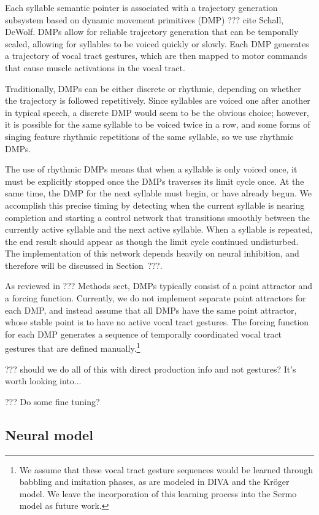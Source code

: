 Each syllable semantic pointer
is associated with a
trajectory generation subsystem
based on dynamic movement primitives (DMP)
??? cite Schall, DeWolf.
DMPs allow for reliable trajectory generation
that can be temporally scaled,
allowing for syllables to be voiced
quickly or slowly.
Each DMP generates a trajectory
of vocal tract gestures,
which are then mapped to
motor commands that cause
muscle activations in the vocal tract.

Traditionally, DMPs can be either discrete or rhythmic,
depending on whether the trajectory
is followed repetitively.
Since syllables are voiced
one after another in typical speech,
a discrete DMP would seem to be
the obvious choice;
however, it is possible for
the same syllable to be voiced
twice in a row,
and some forms of singing
feature rhythmic repetitions
of the same syllable,
so we use rhythmic DMPs.

The use of rhythmic DMPs
means that when a syllable
is only voiced once,
it must be explicitly stopped
once the DMPs traverses
its limit cycle once.
At the same time,
the DMP for the next syllable must begin,
or have already begun.
We accomplish this precise timing
by detecting when the current syllable
is nearing completion
and starting a control network
that transitions smoothly
between the currently active syllable
and the next active syllable.
When a syllable is repeated,
the end result should appear as though
the limit cycle continued undisturbed.
The implementation of this network
depends heavily on neural inhibition,
and therefore will be discussed
in Section~???.

As reviewed in ??? Methods sect,
DMPs typically consist of a point attractor
and a forcing function.
Currently, we do not implement
separate point attractors for each DMP,
and instead assume that all DMPs
have the same point attractor,
whose stable point is
to have no active vocal tract gestures.
The forcing function for each DMP
generates a sequence of temporally coordinated
vocal tract gestures
that are defined manually.\footnote{
  We assume that these vocal tract gesture sequences
  would be learned through babbling and imitation phases,
  as are modeled in DIVA and the Kr\"{o}ger model.
  We leave the incorporation of this learning process
  into the Sermo model as future work.}

??? should we do all of this with direct production info
and not gestures? It's worth looking into...

??? Do some fine tuning?

\subsection{Neural model}


